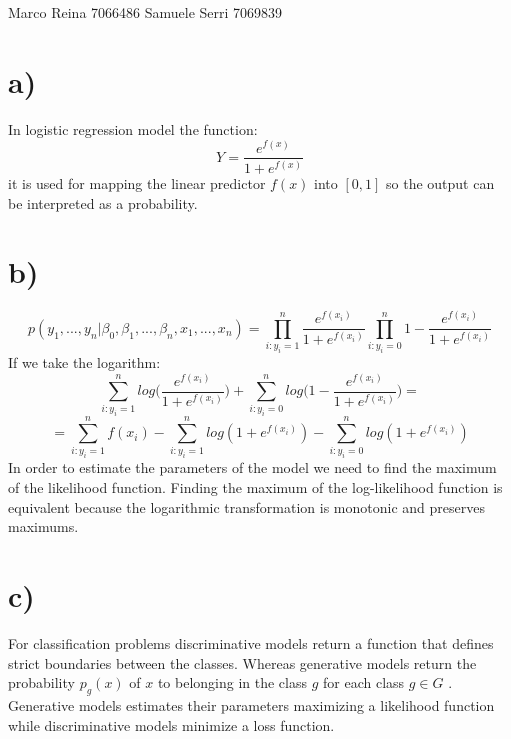 \documentclass[12pt]{article}
\begin{document}
\section*{}
Marco Reina 7066486 \newline
Samuele Serri 7069839 \newline
\section*{a)}
In logistic regression model the function:
\begin{equation*}
    Y = \frac{e^{f(x)}}{1 + e^{f(x)}}
\end{equation*}
it is used for mapping the linear predictor $f(x)$ into $[0, 1]$ so the output can be interpreted as a probability.
\section{b)}
\begin{equation*}
    p(y_1, ..., y_n| \beta_0, \beta_1, ...,\beta_n, x_1, ..., x_n) = \prod_{i : y_i= 1}^n \frac{e^{f(x_i)}}{1 + e^{f(x_i)}}\prod_{i : y_i = 0}^n 1 - \frac{e^{f(x_i)}}{1 + e^{f(x_i)}}
\end{equation*}
If we take the logarithm: \begin{equation*}
    \sum_{i: y_i = 1}^n{log\bigg(\frac{e^{f(x_i)}}{1 + e^{f(x_i)}}\bigg)} + \sum_{i:y_i = 0}^nlog\bigg( 1 - \frac{e^{f(x_i)}}{1 + e^{f(x_i)}}\bigg) = 
\end{equation*}
\begin{equation*}
    =  \sum_{i: y_i = 1}^n f(x_i) -  \sum_{i: y_i = 1}^nlog(1 + e^{f(x_i)}) - \sum_{i:y_i = 0}^nlog(1 + e^{f(x_i)})
\end{equation*}
In order to estimate the parameters of the model we need to find the maximum of the likelihood function. Finding the maximum of the log-likelihood function is equivalent because the logarithmic transformation is monotonic and preserves maximums.
\section*{c)}
For classification problems discriminative models return a function that defines strict boundaries between the classes. Whereas generative models return the probability $p_g(x)$ of $x$ to belonging in the class $g$ for each class $g \in G$ . \newline
Generative models estimates their parameters maximizing a likelihood function while discriminative models minimize a loss function. 
\end{document}
